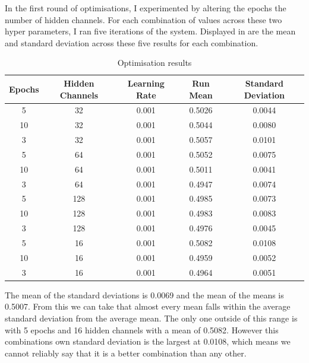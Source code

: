 \documentclass{l4proj}
\begin{document}
In the first round of optimisations, I experimented by altering the epochs the number of hidden channels. For each combination of values across these two hyper parameters, I ran five iterations of the system. Displayed in  are the mean and standard deviation across these five results for each combination. \\

\begin{table}[h]
    \centering
    \caption{Optimisation results}
    \label{tab:Optimisation_results}
    \begin{tabular}{|c|c|c|c|c|}
        \hline
        \textbf{Epochs} & \textbf{Hidden Channels} & \textbf{Learning Rate} & \textbf{Run Mean} & \textbf{Standard Deviation} \\ \hline
        5 & 32 & 0.001 & 0.5026 & 0.0044 \\ \hline
        10 & 32 & 0.001 & 0.5044 & 0.0080 \\ \hline
        3 & 32 & 0.001 & 0.5057 & 0.0101 \\ \hline
        5 & 64 & 0.001 & 0.5052 & 0.0075 \\ \hline
        10 & 64 & 0.001 &0.5011 & 0.0041 \\ \hline
        3 & 64 & 0.001 & 0.4947 & 0.0074 \\ \hline
        5 & 128 & 0.001 & 0.4985 & 0.0073 \\ \hline
        10 & 128 & 0.001 & 0.4983 & 0.0083 \\ \hline
        3 & 128 & 0.001 & 0.4976 & 0.0045 \\ \hline
        5 & 16 & 0.001 & 0.5082 & 0.0108 \\ \hline
        10 & 16 & 0.001 & 0.4959 & 0.0052 \\ \hline
        3 & 16 & 0.001 & 0.4964 & 0.0051 \\ \hline
    \end{tabular}
\end{table}

The mean of the standard deviations is 0.0069 and the mean of the means is 0.5007. From this we can take that almost every mean falls within the average standard deviation from the average mean. The only one outside of this range is with 5 epochs and 16 hidden channels with a mean of 0.5082. However this combinations own standard deviation is the largest at 0.0108, which means we cannot reliably say that it is a better combination than any other.\\
\end{document}
